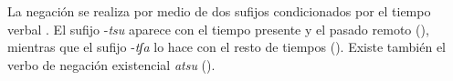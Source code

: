 La negación se realiza por medio de dos sufijos condicionados por el tiempo verbal \textcolor{MidnightBlue}{\citep{aguaruna}}. El sufijo {\setmainfont{Charis SIL} -\textit{tsu}} aparece con el tiempo presente y el pasado remoto (), mientras que el sufijo {\setmainfont{Charis SIL} -\textit{tʃa}} lo hace con el resto de tiempos (). Existe también el verbo de negación existencial {\setmainfont{Charis SIL} \textit{atsu}} ().